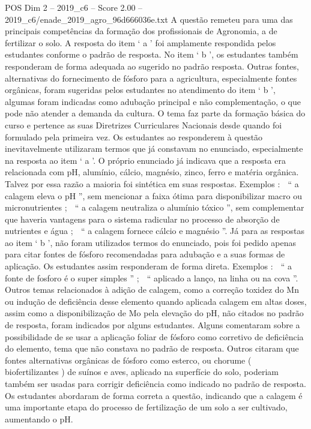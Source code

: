 \begin{textsample}{POS Dim 2 – 2019\_c6 – Score 2.00 – 2019\_c6/enade\_2019\_agro\_96d666036e.txt}
A questão remeteu para uma das principais competências da formação dos profissionais de Agronomia, a de fertilizar o solo.
A resposta do item ‘ a ’ foi amplamente respondida pelos estudantes conforme o padrão de resposta.
No item ‘ b ’, os estudantes também responderam de forma adequada ao sugerido no padrão resposta.
Outras fontes, alternativas do fornecimento de fósforo para a agricultura, especialmente fontes orgânicas, foram sugeridas pelos estudantes no atendimento do item ‘ b ’, algumas foram indicadas como adubação principal e não complementação, o que pode não atender a demanda da cultura.
O tema faz parte da formação básica do curso e pertence as suas Diretrizes Curriculares Nacionais desde quando foi formulado pela primeira vez.
Os estudantes ao responderem à questão inevitavelmente utilizaram termos que já constavam no enunciado, especialmente na resposta ao item ‘ a ’.
O próprio enunciado já indicava que a resposta era relacionada com pH, alumínio, cálcio, magnésio, zinco, ferro e matéria orgânica.
Talvez por essa razão a maioria foi sintética em suas respostas.
Exemplos :  “ a calagem eleva o pH ”, sem mencionar a faixa ótima para disponibilizar macro ou micronutrientes ;  “ a calagem neutraliza o alumínio tóxico ”, sem complementar que haveria vantagens para o sistema radicular no processo de absorção de nutrientes e água ;  “ a calagem fornece cálcio e magnésio ”.
Já para as respostas ao item ‘ b ’, não foram utilizados termos do enunciado, pois foi pedido apenas para citar fontes de fósforo recomendadas para adubação e a suas formas de aplicação.
Os estudantes assim responderam de forma direta.
Exemplos :  “ a fonte de fosforo é o super simples ” ;  “ aplicado a lanço, na linha ou na cova ”.
Outros temas relacionados à adição de calagem, como a correção toxidez do Mn ou indução de deficiência desse elemento quando aplicada calagem em altas doses, assim como a disponibilização de Mo pela elevação do pH, não citados no padrão de resposta, foram indicados por alguns estudantes.
Alguns comentaram sobre a possibilidade de se usar a aplicação foliar de fósforo como corretivo de deficiência do elemento, tema que não constava no padrão de resposta.
Outros citaram que fontes alternativas orgânicas de fósforo como esterco, ou chorume ( biofertilizantes ) de suínos e aves, aplicado na superfície do solo, poderiam também ser usadas para corrigir deficiência como indicado no padrão de resposta.
Os estudantes abordaram de forma correta a questão, indicando que a calagem é uma importante etapa do processo de fertilização de um solo a ser cultivado, aumentando o pH.

\end{textsample}
